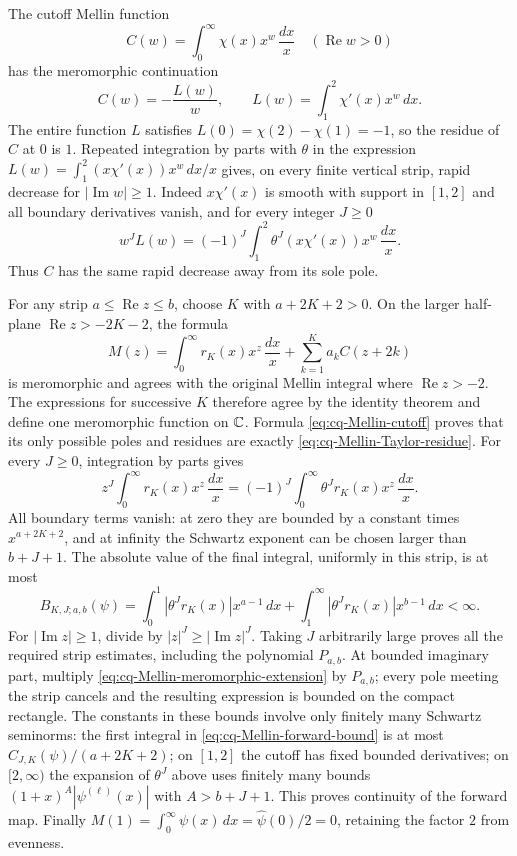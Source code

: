 The cutoff Mellin function
\[
 C(w)=\int_0^\infty\chi(x)x^w\,\frac{dx}{x}
       \quad(\operatorname{Re}w>0)
\]
has the meromorphic continuation
\begin{equation}\label{eq:cq-Mellin-cutoff}
 C(w)=-\frac{L(w)}{w},\qquad
 L(w)=\int_1^2\chi'(x)x^w\,dx.
\end{equation}
The entire function $L$ satisfies $L(0)=\chi(2)-\chi(1)=-1$,
so the residue of $C$ at $0$ is $1$. Repeated integration by
parts with $\theta$ in the expression
$L(w)=\int_1^2(x\chi'(x))x^w\,dx/x$ gives, on every finite
vertical strip, rapid decrease for $|\operatorname{Im}w|\geq1$.
Indeed $x\chi'(x)$ is smooth with support in $[1,2]$ and all
boundary derivatives vanish, and for every integer $J\geq0$
\[
 w^JL(w)=(-1)^J\int_1^2
       \theta^J(x\chi'(x))x^w\,\frac{dx}{x}.
\]
Thus $C$ has the same rapid decrease away from its sole pole.

For any strip $a\leq\operatorname{Re}z\leq b$, choose $K$
with $a+2K+2>0$. On the larger half-plane
$\operatorname{Re}z>-2K-2$, the formula
\begin{equation}\label{eq:cq-Mellin-meromorphic-extension}
 M(z)=\int_0^\infty r_K(x)x^z\,\frac{dx}{x}
                     +\sum_{k=1}^K a_k C(z+2k)
\end{equation}
is meromorphic and agrees with the original Mellin integral where
$\operatorname{Re}z>-2$. The expressions for successive $K$
therefore agree by the identity theorem and define one meromorphic
function on $\mathbb C$. Formula \eqref{eq:cq-Mellin-cutoff} proves
that its only possible poles and residues are exactly
\eqref{eq:cq-Mellin-Taylor-residue}.
For every $J\geq0$, integration by parts gives
\[
 z^J\int_0^\infty r_K(x)x^z\,\frac{dx}{x}
       =(-1)^J\int_0^\infty\theta^Jr_K(x)x^z\,\frac{dx}{x}.
\]
All boundary terms vanish: at zero they are bounded by a constant
times $x^{a+2K+2}$, and at infinity the Schwartz exponent can
be chosen larger than $b+J+1$. The absolute value of the final
integral, uniformly in this strip, is at most
\begin{equation}\label{eq:cq-Mellin-forward-bound}
 B_{K,J;a,b}(\psi)=
 \int_0^1|\theta^Jr_K(x)|x^{a-1}\,dx
 +\int_1^\infty|\theta^Jr_K(x)|x^{b-1}\,dx<\infty.
\end{equation}
For $|\operatorname{Im}z|\geq1$, divide by $|z|^J\geq
|\operatorname{Im}z|^J$. Taking $J$ arbitrarily large proves
all the required strip estimates, including the polynomial
$P_{a,b}$. At bounded imaginary part, multiply
\eqref{eq:cq-Mellin-meromorphic-extension} by $P_{a,b}$;
every pole meeting the strip cancels and the resulting expression
is bounded on the compact rectangle. The constants in these
bounds involve only finitely many Schwartz seminorms:
the first integral in \eqref{eq:cq-Mellin-forward-bound} is
at most $C_{J,K}(\psi)/(a+2K+2)$; on $[1,2]$ the cutoff
has fixed bounded derivatives; on $[2,\infty)$ the expansion
of $\theta^J$ above uses finitely many bounds
$(1+x)^A|\psi^{(\ell)}(x)|$ with $A>b+J+1$.
This proves continuity of the forward map.
Finally $M(1)=\int_0^\infty\psi(x)\,dx
=\widehat\psi(0)/2=0$, retaining the factor $2$ from evenness.

